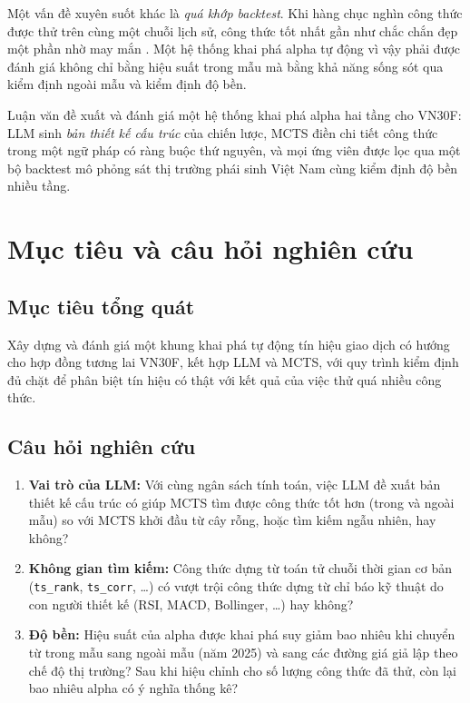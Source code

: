 \documentclass[12pt,a4paper]{article}
\newcommand{\code}[1]{\texttt{#1}}
\begin{document}
Một vấn đề xuyên suốt khác là \emph{quá khớp backtest}. Khi hàng chục nghìn công thức được thử trên cùng một chuỗi lịch sử, công thức tốt nhất gần như chắc chắn đẹp một phần nhờ may mắn \citep{white2000reality,harvey2016cross,bailey2017pbo}. Một hệ thống khai phá alpha tự động vì vậy phải được đánh giá không chỉ bằng hiệu suất trong mẫu mà bằng khả năng sống sót qua kiểm định ngoài mẫu và kiểm định độ bền.

Luận văn đề xuất và đánh giá một hệ thống khai phá alpha hai tầng cho VN30F: LLM sinh \emph{bản thiết kế cấu trúc} của chiến lược, MCTS điền chi tiết công thức trong một ngữ pháp có ràng buộc thứ nguyên, và mọi ứng viên được lọc qua một bộ backtest mô phỏng sát thị trường phái sinh Việt Nam cùng kiểm định độ bền nhiều tầng.

\section{Mục tiêu và câu hỏi nghiên cứu}

\subsection{Mục tiêu tổng quát}
Xây dựng và đánh giá một khung khai phá tự động tín hiệu giao dịch có hướng cho hợp đồng tương lai VN30F, kết hợp LLM và MCTS, với quy trình kiểm định đủ chặt để phân biệt tín hiệu có thật với kết quả của việc thử quá nhiều công thức.

\subsection{Câu hỏi nghiên cứu}
\begin{enumerate}[label=\textbf{RQ\arabic*.}, leftmargin=3em]
  \item \textbf{Vai trò của LLM:} Với cùng ngân sách tính toán, việc LLM đề xuất bản thiết kế cấu trúc có giúp MCTS tìm được công thức tốt hơn (trong và ngoài mẫu) so với MCTS khởi đầu từ cây rỗng, hoặc tìm kiếm ngẫu nhiên, hay không?
  \item \textbf{Không gian tìm kiếm:} Công thức dựng từ toán tử chuỗi thời gian cơ bản (\code{ts\_rank}, \code{ts\_corr}, \ldots) có vượt trội công thức dựng từ chỉ báo kỹ thuật do con người thiết kế (RSI, MACD, Bollinger, \ldots) hay không?
  \item \textbf{Độ bền:} Hiệu suất của alpha được khai phá suy giảm bao nhiêu khi chuyển từ trong mẫu sang ngoài mẫu (năm 2025) và sang các đường giá giả lập theo chế độ thị trường? Sau khi hiệu chỉnh cho số lượng công thức đã thử, còn lại bao nhiêu alpha có ý nghĩa thống kê?
\end{enumerate}
\end{document}
